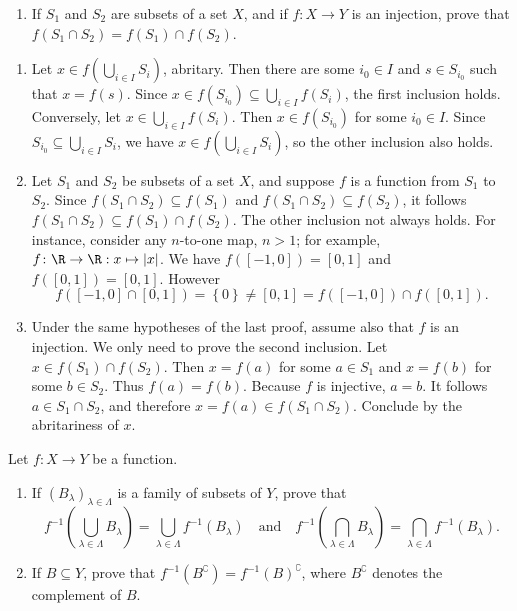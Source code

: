 \begin{questions}
\begin{enumerate}[label=(\alph*)]
        \item If \(S_1\) and \(S_2\) are subsets of a set \(X\), and if \(f\colon X \rightarrow Y\) is an injection, prove that \(f\left(S_1 \cap S_2\right)=f\left(S_1\right) \cap f\left(S_2\right)\).
    \end{enumerate}

\begin{theproof}
\begin{enumerate}[label=(\alph*)]
    \item Let \(x\in f\left(\bigcup_{i \in I} S_i\right)\), abritary. Then there are some \(i_0\in I\) and  \(s\in S_{i_0}\) such that  \(x=f(s)\). 
    Since \(x\in f(S_{i_0}) \subseteq \bigcup_{i \in I} f\left(S_i\right)\), the first inclusion holds. 
    Conversely, let \(x\in \bigcup_{i \in I} f\left(S_i\right)\). 
    Then \(x\in f(S_{i_0})\) for some \(i_0\in I\).
    Since \(S_{i_0}\subseteq \bigcup_{i \in I} S_i\), we have \(x\in f\left(\bigcup_{i \in I} S_i\right)\), so the other inclusion also holds.

    \item Let \(S_1\) and \(S_2\) be subsets of a set \(X\), and suppose \(f\) is a function from \(S_1\) to \(S_2\).
    Since \(f\left(S_1 \cap S_2\right) \subseteq f\left(S_1\right) \) and \(f\left(S_1 \cap S_2\right) \subseteq f\left(S_2\right) \), it follows \(f\left(S_1 \cap S_2\right) \subseteq f\left(S_1\right) \cap f\left(S_2\right)\). 
    The other inclusion not always holds.
    For instance, consider any \(n\)-to-one map, \(n>1\); for example, \(f\colon \R\to \R: x\mapsto |x|\). We have \(f([-1,0]) = [0,1]\) and \(f([0,1]) = [0,1]\). However \[
        f([-1,0]\cap [0,1])  = \left\{ 0 \right\} \neq [0,1] = f([-1,0])\cap f([0,1]).
    \]

    \item Under the same hypotheses of the last proof, assume also that \(f\) is an injection. 
    We only need to prove the second inclusion. 
    Let \(x\in f\left(S_1\right) \cap f\left(S_2\right)\). Then \(x= f(a)\) for some \(a\in S_1\) and  \(x= f(b)\) for some \(b\in S_2\). Thus \(f(a) = f(b)\). Because \(f\) is injective, \(a=b\). 
    It follows \(a\in S_1\cap S_2\), and therefore \(x=f(a)\in f(S_1\cap S_2)\). Conclude by the abritariness of \(x\).
\end{enumerate}    
\end{theproof}


\question
    Let \(f: X \rightarrow Y\) be a function.
    \begin{enumerate}[label=(\alph*)]
        \item If \((B_\lambda)_{\lambda\in \Lambda} \) is a family of subsets of \(Y\), prove that
\[
f^{-1}\left(\bigcup_{\lambda\in\Lambda} B_{\lambda}\right)=\bigcup_{\lambda\in\Lambda} f^{-1}\left(B_\lambda\right) \quad\text{and}\quad f^{-1}\left(\bigcap_{\lambda\in\Lambda} B_\lambda\right)=\bigcap_{\lambda\in\Lambda} f^{-1}\left(B_{\lambda}\right).
\]
        \item If \(B \subseteq Y\), prove that \(f^{-1}\left(B^{\complement}\right)=f^{-1}(B)^{\complement}\), where \(B^{\complement}\) denotes the complement of \(B\).
    \end{enumerate}


\end{questions}
